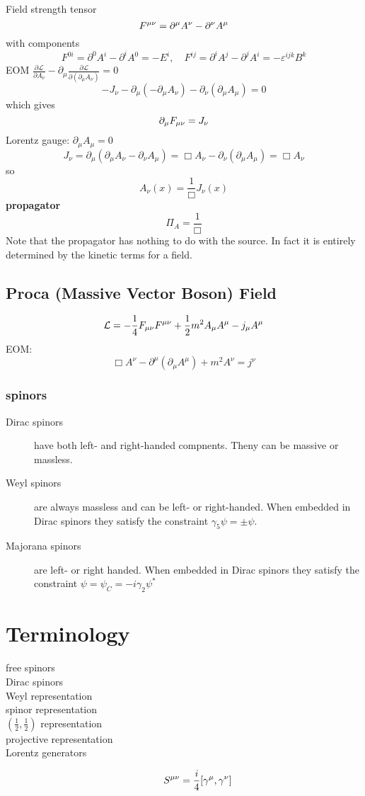 Field strength tensor 
\[ F^{\mu\nu} = \partial^{\mu}A^{\nu} - \partial^{\nu}A^{\mu} \] 
with components 
\[ F^{0i} = \partial^{0}A^{i} - \partial^{i}A^{0} = -E^{i}, 
\quad
F^{ij} = \partial^{i}A^{j} - \partial^{j}A^{i} = -\varepsilon^{ijk}B^{k} \]
EOM
$\frac{\partial\mathcal{L}}{\partial{A_\nu}}-\partial_\mu\frac{\partial\mathcal{L}}{\partial(\partial_{\mu}A_\nu)}=0$
\[-J_\nu-\partial_\mu(-\partial_{\mu}A_\nu)-\partial_\nu(\partial_{\mu}A_\mu)=0\]
which gives
\[\partial_{\mu}F_{\mu\nu}=J_\nu\]
Lorentz gauge: $\partial_{\mu}A_{\mu}=0$
\[J_{\nu}=\partial_{\mu}(\partial_{\mu}A_\nu-\partial_{\nu}A_{\mu})=\Box{A_\nu}-\partial_{\nu}(\partial_{\mu}A_{\mu})
=\Box{A_{\nu}}\]
so
\[A_{\nu}(x)=\frac{1}{\Box}J_{\nu}(x)\]
\textbf{propagator}
\[\Pi_A=\frac{1}{\Box}\]
Note that the propagator has nothing to do with the source. In fact it is
entirely determined by the kinetic terms for a field.

\subsection{Proca (Massive Vector Boson) Field}
$$ \mathcal{L} = -\frac{1}{4}F_{\mu\nu}F^{\mu\nu} +
\frac{1}{2}m^{2}A_{\mu}A^{\mu} - j_{\mu}A^{\mu} $$
EOM:
$$ \Box A^{\nu} - \partial^{\mu}(\partial_{\mu}A^{\mu}) + m^{2}A^{\nu} =
j^{\nu}$$

\subsubsection{spinors}
\begin{description}
    \item[Dirac spinors] have both left- and right-handed compnents. Theny
	can be massive or massless.
    \item[Weyl spinors] are always massless and can be left- or
	right-handed. When embedded in Dirac spinors they satisfy the
	constraint $\gamma_5\psi=\pm\psi$.
    \item[Majorana spinors] are left- or right handed. When embedded in
	Dirac spinors they satisfy the constraint
	$\psi=\psi_C=-i\gamma_2\psi^*$
\end{description}
\section{Terminology}
\begin{description}
    \item [free spinors]
    \item [Dirac spinors]
    \item [Weyl representation]
    \item [spinor representation]
    \item [$(\frac{1}{2}, \frac{1}{2})$ representation]
    \item [projective representation]
    \item [Lorentz generators]
	\[
	    S^{\mu\nu} = \frac{i}{4}[\gamma^\mu, \gamma^\nu]
	\]
\end{description}


